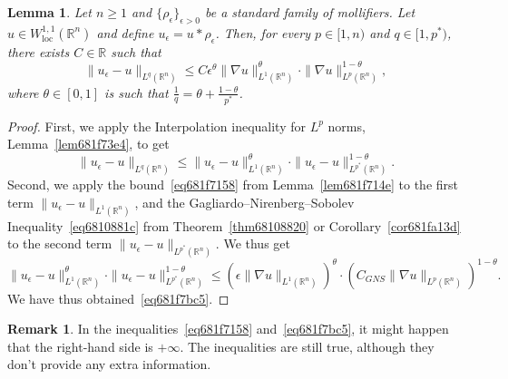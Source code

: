 \documentclass[a4paper,9pt]{amsart}
\newcommand{\R}{\mathbb{R}}	%
\newcommand{\loc}{\mathrm{loc}}
\newcommand{\grad}{\nabla}
\theoremstyle{plain}
\newtheorem{lemma}[proposition]{Lemma}
\theoremstyle{definition}
\newtheorem{remark}[proposition]{Remark}
\newtheorem{exercise}[proposition]{Exercise}%
\theoremstyle{remark}
\begin{document}
\begin{lemma}\label{lem681f796a}
	Let $n\ge1$ and $\{\rho_\epsilon\}_{\epsilon>0}$ be a standard family of mollifiers.
	Let $u\in W^{1,1}_\loc(\R^n)$ and define $u_\epsilon = u*\rho_\epsilon$.
	Then, for every $p\in [1,n)$ and $q\in[1,p^*)$, there exists $C\in\R$ such that
	\begin{equation}\label{eq681f7bc5}
		\| u_\epsilon - u\|_{L^q(\R^n)}
		\le C \epsilon^\theta \|\grad u\|_{L^1(\R^n)}^\theta \cdot \|\grad u\|_{L^{p}(\R^n)}^{1-\theta} ,
	\end{equation}
	where $\theta\in [0,1]$ is such that $\frac1q = \theta + \frac{1-\theta}{p^*}$.
\end{lemma}
\begin{proof}
	First, we apply the Interpolation inequality for $L^p$ norms, Lemma~\ref{lem681f73e4}, to get
	\begin{equation}
		\| u_\epsilon - u\|_{L^q(\R^n)} 
		\le \| u_\epsilon - u\|_{L^1(\R^n)}^\theta \cdot \| u_\epsilon - u\|_{L^{p^*}(\R^n)}^{1-\theta} .
	\end{equation}
	Second, we apply the bound~\eqref{eq681f7158} from Lemma~\ref{lem681f714e} to the first term $\| u_\epsilon - u\|_{L^1(\R^n)}$,
	and the Gagliardo–Nirenberg–Sobolev Inequality~\eqref{eq6810881c} from Theorem~\ref{thm68108820} or Corollary~\ref{cor681fa13d} to the second term $\| u_\epsilon - u\|_{L^{p^*}(\R^n)}$.
	We thus get
	\begin{equation}
	\| u_\epsilon - u\|_{L^1(\R^n)}^\theta \cdot \| u_\epsilon - u\|_{L^{p^*}(\R^n)}^{1-\theta}
	\le \left( \epsilon \|\grad u\|_{L^1(\R^n)} \right)^\theta
		\cdot \left( C_{GNS} \|\grad u\|_{L^p(\R^n)} \right)^{1-\theta} .
	\end{equation}
	We have thus obtained~\eqref{eq681f7bc5}.
\end{proof}


\begin{remark}
	In the inequalities~\eqref{eq681f7158} and~\eqref{eq681f7bc5}, it might happen that the right-hand side is $+\infty$.
	The inequalities are still true, although they don't provide any extra information.
\end{remark}
\end{document}
